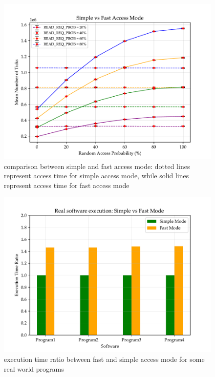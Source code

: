 \documentclass[a4paper,12pt]{article}
\begin{document}
\begin{figure}[H]
  \center
  \includegraphics[width=.8\textwidth]{img/test-simple-vs-fast.pdf}
  \caption{comparison between simple and fast access mode: dotted lines represent access time for simple access mode, while solid lines represent access time for fast access mode}
  \label{fig:test-simple-vs-fast}
\end{figure}

\begin{figure}[H]
  \center
  \includegraphics[width=.8\textwidth]{img/flow.pdf}
  \caption{execution time ratio between fast and simple access mode for some real world programs}
  \label{fig:flow}
\end{figure}
\end{document}
